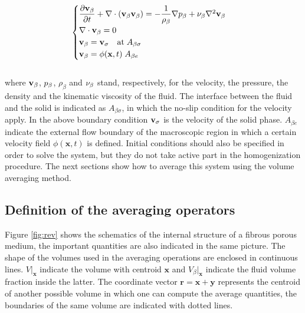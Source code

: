 \begin{eqnarray}
	\begin{cases}
		\dfrac{\partial \textbf{v}_{\beta}}{\partial t} +  \nabla \cdot (\textbf{v}_{\beta} \textbf{v}_{\beta})  = -\dfrac{1}{\rho_{\beta}} \nabla p_{\beta} + \nu_{\beta} \nabla^2  \textbf{v}_{\beta}  \\
		\nabla \cdot \textbf{v}_{\beta} = 0 \\
		\textbf{v}_{\beta} = \textbf{v}_{\sigma} \quad \text{at} \; A_{\beta\sigma} \\
		\textbf{v}_{\beta} = \phi(\mathbf{x}, t) \; A_{\beta e}
	\end{cases}
\label{eq:NS}
\end{eqnarray}\\

\noindent where $\textbf{v}_{\beta}$, $p_{\beta}$, $\rho_{\beta}$ and $\nu_{\beta}$ stand, respectively, for  the velocity, the pressure, the density and the kinematic viscosity of the fluid.
The interface between the fluid and the solid is indicated as $A_{\beta\sigma}$, in which the no-slip condition for the velocity apply.
In the above boundary condition $\textbf{v}_{\sigma}$ is the velocity of the solid phase.
$A_{\beta e}$ indicate the external flow boundary of the macroscopic region in which a certain velocity field $\phi(\mathbf{x}, t)$ is defined.
Initial conditions should also be specified in order to solve the system, but they do not take active part in the homogenization procedure.
The next sections show how to average this system using the volume averaging method.

\subsection{Definition of the averaging operators}
Figure \ref{fig:rev} shows the schematics of the internal structure of a fibrous porous medium, the important quantities are also indicated in the same picture.
The shape of the volumes used in the averaging operations are enclosed in continuous lines. $V|_{\mathbf{x}}$ indicate the volume with centroid $\mathbf{x}$ and $V_{\beta}|_{\mathbf{x}}$ indicate the fluid volume fraction inside the latter.
The coordinate vector $\mathbf{r} = \mathbf{x} +\mathbf{y}$ represents the centroid of another possible volume in which one can compute the average quantities, the boundaries of the same volume are indicated with dotted lines.


